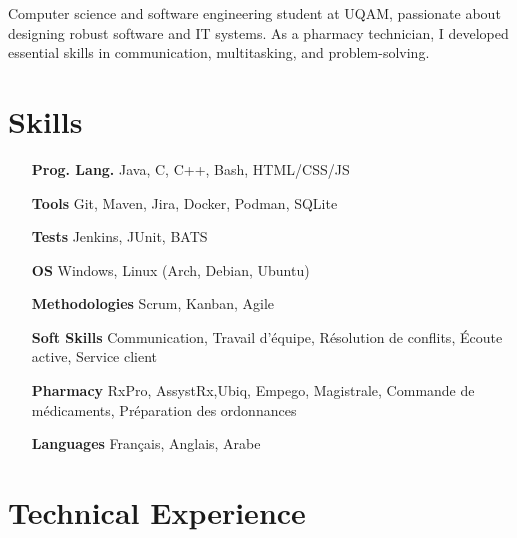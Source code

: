 \documentclass[letterpaper,10pt]{article}
\begin{document}


  Computer science and software engineering student at UQAM, passionate about designing robust software and IT systems. As a pharmacy technician, I developed essential skills in communication, multitasking, and problem-solving.

  \section{Skills}

  \begin{multicols}{2}
    \begin{itemize}[itemsep=-2px, parsep=5pt, leftmargin=75pt]
      \item[\textbf{Prog. Lang.}] Java, C, C++, Bash, HTML/CSS/JS
      \item[\textbf{Tools}] Git, Maven, Jira, Docker, Podman, SQLite
      \item[\textbf{Tests}] Jenkins, JUnit, BATS
      \item[\textbf{OS}]  Windows, Linux (Arch, Debian, Ubuntu)
      \item[\textbf{Methodologies}]  Scrum, Kanban, Agile
      \item[\textbf{Soft Skills}]  Communication, Travail d'équipe, Résolution de conflits, Écoute active, Service client
      \item[\textbf{Pharmacy}]  RxPro, AssystRx,Ubiq, Empego, Magistrale, Commande de médicaments, Préparation des ordonnances
      \item[\textbf{Languages}]  Français, Anglais, Arabe
    \end{itemize}
  \end{multicols}


  \section{Technical Experience}
\end{document}
